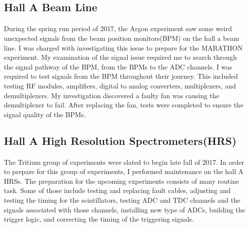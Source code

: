 \documentclass[12pt,letterpaper]{article}
\begin{document}
 \subsection*{Hall A Beam Line}
\paragraph{} During the spring run period of 2017, the Argon experiment saw some weird unexpected signals from the beam position monitors(BPM) on the hall a beam line. I was charged with investigating this issue to prepare for the MARATHON experiment. My examination of the signal issue required me to search through the signal pathway of the BPM, from the BPMs to the ADC channels. I was required to test signals from the BPM throughout their journey. This included testing RF modules, amplifiers, digital to analog converters, multiplexers, and demultiplexers. My investigation discovered a faulty fan was causing the demultiplexer to fail. After replacing the fan, tests were completed to ensure the signal quality of the BPMs. 
  
\subsection*{Hall A High Resolution Spectrometers(HRS)}
\paragraph{}The Tritium group of experiments were slated to begin late fall of 2017. In order to prepare for this group of experiments, I performed maintenance on the hall A HRSs. The preparation for the upcoming experiments consists of many routine task. Some of those include testing and replacing fault cables, adjusting and testing the timing for the scintillators, testing ADC and TDC channels and the signals associated with those channels, installing new type of ADCs, building the trigger logic, and correcting the timing of the triggering signals. 
\end{document}
